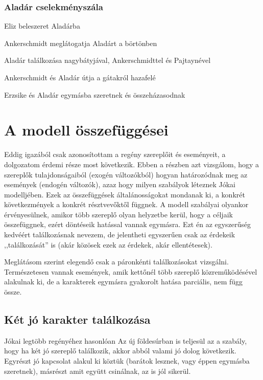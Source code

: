 \documentclass{thesis-ekf}
\begin{document}
    \subsection{Aladár cselekményszála}

    \begin{compactitem}
        \item Eliz beleszeret Aladárba
        \item Ankerschmidt meglátogatja Aladárt a börtönben
        \item Aladár találkozása nagybátyjával, Ankerschmidttel és Pajtaynével
        \item Ankerschmidt és Aladár útja a gátakról hazafelé
        \item Erzsike és Aladár egymásba szeretnek és összeházasodnak
    \end{compactitem}

    \chapter{A modell összefüggései}\label{ch:a-modell-osszefuggesei}

    Eddig igazából csak azonosítottam a regény szereplőit és eseményeit, a dolgozatom érdemi része most következik.
    Ebben a részben azt vizsgálom, hogy a szereplők tulajdonságaiból (exogén változókból)
        hogyan határozódnak meg az események (endogén változók), azaz hogy milyen szabályok léteznek Jókai modelljében.
    Ezek az összefüggések általánosságokat mondanak ki, a konkrét következmények a konkrét résztvevőktől függnek.
    A modell szabályai olyankor érvényesülnek, amikor több szereplő olyan helyzetbe kerül, hogy a céljaik összefüggnek,
        ezért döntéseik hatással vannak egymásra.
    Ezt én az egyszerűség kedvéért találkozásnak nevezem, de jelentheti egyszerűen csak az érdekeik ,,találkozását'' is
        (akár közösek ezek az érdekek, akár ellentétesek).

    Meglátásom szerint elegendő csak a páronkénti találkozásokat vizsgálni.
    Természetesen vannak események, amik kettőnél több szereplő közreműködésével alakulnak ki,
        de a karakterek egymásra gyakorolt hatása parciális, nem függ össze.

    \section{Két jó karakter találkozása}\label{sec:ket-jo-karakter-talalkozasa}

    Jókai legtöbb regényéhez hasonlóan Az új földesúrban is teljesül az a szabály,
        hogy ha két jó szereplő találkozik, akkor abból valami jó dolog következik.
    Egyrészt jó kapcsolat alakul ki köztük (barátok lesznek, vagy éppen egymásba szeretnek),
        másrészt amit együtt csinálnak, az is jól sikerül.
\end{document}

